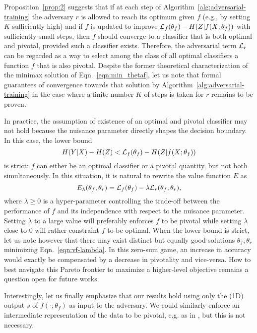 \documentclass{article}
\theoremstyle{plain}
\begin{document}
Proposition~\ref{prop:2} suggests that if at each step of
Algorithm~\ref{alg:adversarial-training} the adversary $r$ is allowed to reach
its optimum given $f$ (e.g., by setting $K$ sufficiently high) and if $f$ is
updated to improve ${\cal L}_f(\theta_f) -  H({Z|f(X;\theta_f)})$ with
sufficiently small steps, then $f$ should converge to a classifier that is both
optimal and pivotal, provided such a classifier exists. Therefore, the adversarial term ${\cal L}_r$
can be regarded as a way to select among
the class of all optimal classifiers a function $f$ that is also pivotal.
Despite the former theoretical characterization of the minimax solution
of Eqn.~\ref{eqn:min_thetaf}, let us note that formal guarantees of
convergence towards that solution by
Algorithm~\ref{alg:adversarial-training} in the case where a finite number $K$
of steps is taken for $r$ remains to be proven.

In practice, the assumption of existence of an optimal and pivotal classifier may
not hold because the nuisance parameter directly shapes the decision boundary.
In this case, the lower bound
\begin{equation}\label{eqn:lower-bound-strict}
    H({Y|X}) - H(Z) < {\cal L}_f(\theta_f) - H({Z|f(X;\theta_f)})
\end{equation} is strict: $f$ can either be an optimal classifier or a
pivotal quantity, but not both simultaneously. In this situation, it is natural
to rewrite the value function $E$  as
\begin{equation}\label{eqn:vf-lambda}
    E_\lambda(\theta_f, \theta_r) = {\cal L}_f(\theta_f) - \lambda {\cal L}_r(\theta_f, \theta_r),
\end{equation}
where $\lambda \geq 0$ is a hyper-parameter controlling the trade-off between
the performance of $f$ and its independence with respect to the nuisance
parameter. Setting $\lambda$ to a large value will preferably enforces $f$ to be
pivotal while setting $\lambda$ close to $0$ will rather constraint $f$ to be
optimal. When the lower bound is strict, let us note however that there may
exist distinct but equally good solutions $\theta_f,\theta_r$ minimizing
Eqn.~\ref{eqn:vf-lambda}. In this zero-sum game, an increase in accuracy would
exactly be compensated by a decrease in pivotality and vice-versa. How to best
navigate this Pareto frontier to maximize a higher-level objective remains a
question open for future works.

Interestingly, let us finally emphasize that our results hold using only the
(1D) output $s$ of $f(\cdot;\theta_f)$ as
input to the adversary. We could similarly enforce an intermediate
representation of the data to be pivotal, e.g. as in
\citep{ganin2014unsupervised}, but this is not necessary.
\end{document}
